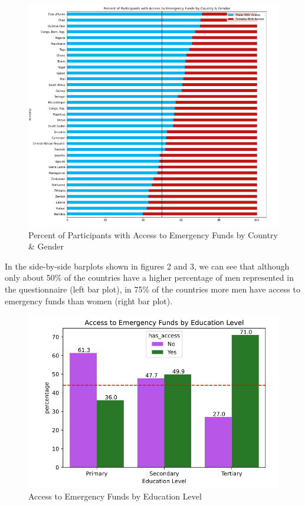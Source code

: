 \documentclass[water,article,submit,moreauthors,pdftex]{mdpi}
\begin{document}
\begin{figure}
\centering
\includegraphics[width=\textwidth,height=0.5\textheight]{images/percent_access_funds_by_country_gender.png}
\caption{Percent of Participants with Access to Emergency Funds by
Country \& Gender}
\end{figure}

In the side-by-side barplots shown in figures 2 and 3, we can see that
although only about 50\% of the countries have a higher percentage of
men represented in the questionnaire (left bar plot), in 75\% of the
countries more men have access to emergency funds than women (right bar
plot).

\begin{figure}
\centering
\includegraphics[width=\textwidth,height=0.5\textheight]{images/access_by_educ_level.png}
\caption{Access to Emergency Funds by Education Level}
\end{figure}
\end{document}
